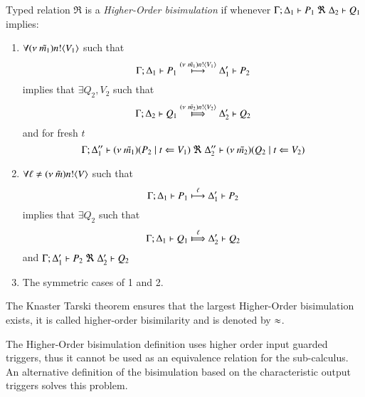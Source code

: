 \begin{definition}\rm
	\label{def:bisim}
	Typed relation
	$\Re$ is a {\em Higher-Order bisimulation} if whenever
	$\horel{\Gamma}{\Delta_1}{P_1}{\ \Re\ }{\Delta_2}{Q_1}$ implies:
%
	\begin{enumerate}
		\item	$\forall (\nu\ \tilde{m_1}) n ! \langle V_1 \rangle$ such that
			\[
				\Gamma; \Delta_1 \vdash P_1 \stackrel{(\nu\ \tilde{m_1}) n ! \langle V_1 \rangle}{\longmapsto} \Delta_1' \vdash P_2
			\]
			implies that $\exists Q_2, V_2$ such that
			\[
				\horel{\Gamma}{\Delta_2}{Q_1}{\Hby{\news{\tilde{m_2}} \bactout{n}{V_2}}}{\Delta_2'}{Q_2}
			\]
			and for fresh $t$
			\[
				\Gamma; \Delta_1'' \vdash (\nu\ \tilde{m_1})(P_2 \;|\; t \Leftarrow V_1) \ \Re\  \Delta_2'' \vdash{(\nu\ \tilde{m_2})(Q_2 \;|\;t \Leftarrow V_2)}
			\]
%
		\item	$\forall \ell \not= (\nu\ \tilde{m}) n ! \langle V \rangle$ such that
			\[
				\Gamma; \Delta_1 \vdash P_1 \stackrel{\ell}{\longmapsto} \Delta_1' \vdash P_2
			\]
			implies that $\exists Q_2$ such that 
			\[
				\horel{\Gamma}{\Delta_1}{Q_1}{\Hby{\ell}}{\Delta_2'}{Q_2}
			\]
			and
			$\horel{\Gamma}{\Delta_1'}{P_2}{\ \Re\ }{\Delta_2'}{Q_2}$

		\item	The symmetric cases of 1 and 2.
	\end{enumerate}
	The Knaster Tarski theorem ensures that the largest Higher-Order bisimulation exists,
	it is called higher-order bisimilarity and is denoted by $\approx$.
\end{definition}
%
The Higher-Order bisimulation definition uses higher order input guarded triggers,
thus it cannot be used as an equivalence relation for the \sessp sub-calculus.
An alternative definition of the bisimulation based on the characteristic
output triggers solves this problem.

